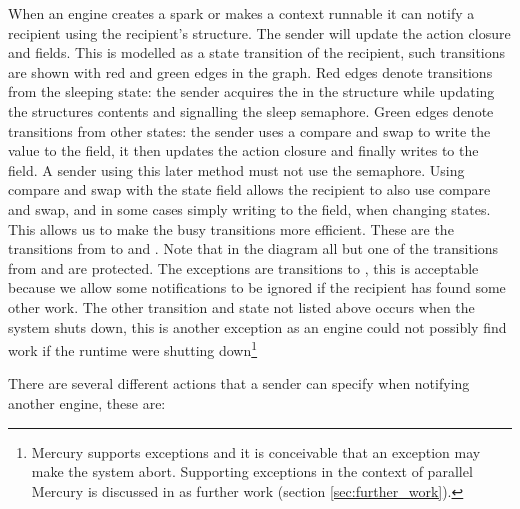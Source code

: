 When an engine creates a spark or makes a context runnable
it can notify a recipient using the recipient's
\enginesleepsync structure.
The sender will update the action closure and
 fields.
This is modelled as a state transition of the recipient,
such transitions are shown with red and green edges in the graph.
Red edges denote transitions from the sleeping state:
the sender acquires the  in the
\enginesleepsync structure while updating the structures contents and
signalling the sleep semaphore. 
Green edges denote transitions from other states:
the sender uses a compare and swap to write the  value to the
 field,
it then updates the action closure
and finally writes  to the  field.
A sender using this later method must not use the semaphore.
Using compare and swap with the state field allows the recipient to also
use compare and swap, and in some cases simply writing to the field,
when changing states.
This allows us to make the busy transitions more efficient.
These are the transitions from 
 to
 and 
.
Note that in the diagram all but one of the transitions from
 and 
are protected.
The exceptions are transitions to ,
this is acceptable because we allow some notifications to be ignored if the
recipient has found some other work.
The other transition and state not listed above occurs when the system shuts
down,
this is another exception as an engine could not possibly find work if the
runtime were shutting down\footnote{
    Mercury supports exceptions and it is conceivable that an exception may
    make the system abort.
    Supporting exceptions in the context of parallel Mercury is discussed in
    as further work (section \ref{sec:further_work}).
}

There are several different actions that a sender can specify when notifying
another engine,
these are:

